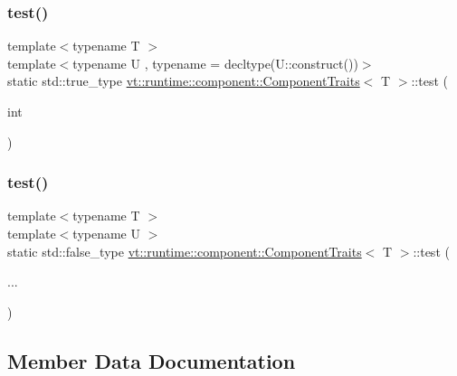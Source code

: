 \subsubsection{\texorpdfstring{test()}{test()}\hspace{0.1cm}{\footnotesize\ttfamily [1/2]}}
{\footnotesize\ttfamily template$<$typename T $>$ \\
template$<$typename U , typename  = decltype(\+U\+::construct())$>$ \\
static std\+::true\+\_\+type \hyperlink{structvt_1_1runtime_1_1component_1_1_component_traits}{vt\+::runtime\+::component\+::\+Component\+Traits}$<$ T $>$\+::test (\begin{DoxyParamCaption}\item[{int}]{ }\end{DoxyParamCaption})\hspace{0.3cm}{\ttfamily [static]}}

\mbox{\label{structvt_1_1runtime_1_1component_1_1_component_traits_ac1c10ab56a5d4d979c4db8e0e07377a3}} 
\subsubsection{\texorpdfstring{test()}{test()}\hspace{0.1cm}{\footnotesize\ttfamily [2/2]}}
{\footnotesize\ttfamily template$<$typename T $>$ \\
template$<$typename U $>$ \\
static std\+::false\+\_\+type \hyperlink{structvt_1_1runtime_1_1component_1_1_component_traits}{vt\+::runtime\+::component\+::\+Component\+Traits}$<$ T $>$\+::test (\begin{DoxyParamCaption}\item[{}]{... }\end{DoxyParamCaption})\hspace{0.3cm}{\ttfamily [static]}}



\subsection{Member Data Documentation}
\mbox{\label{structvt_1_1runtime_1_1component_1_1_component_traits_acdb8f8598d2317e5d6b4206bdbf682b5}} 
